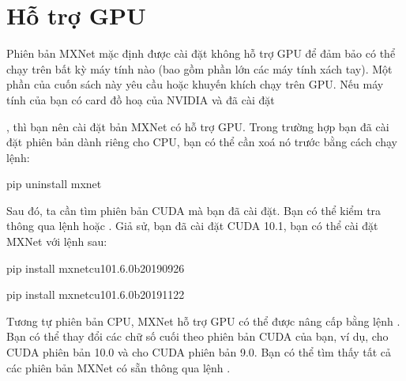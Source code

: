 \documentclass[letterpaper,11pt,english]{sphinxmanual}
\begin{document}
\section{Hỗ trợ GPU}
\label{\detokenize{chapter_install/index_vn:ho-tro-gpu}}\label{\detokenize{chapter_install/index_vn:sec-gpu}}


Phiên bản MXNet mặc định được cài đặt không hỗ trợ GPU để đảm bảo có thể
chạy trên bất kỳ máy tính nào (bao gồm phần lớn các máy tính xách tay).
Một phần của cuốn sách này yêu cầu hoặc khuyến khích chạy trên GPU. Nếu
máy tính của bạn có card đồ hoạ của NVIDIA và đã cài đặt
%
\begin{footnote}[27]\sphinxAtStartFootnote
{}
%
\end{footnote}, thì bạn nên cài
đặt bản MXNet có hỗ trợ GPU. Trong trường hợp bạn đã cài đặt phiên bản
dành riêng cho CPU, bạn có thể cần xoá nó trước bằng cách chạy lệnh:

\begin{sphinxVerbatim}[commandchars=\\\{\}]
pip uninstall mxnet
\end{sphinxVerbatim}



Sau đó, ta cần tìm phiên bản CUDA mà bạn đã cài đặt. Bạn có thể kiểm tra
thông qua lệnh  hoặc
. Giả sử, bạn đã cài đặt CUDA 10.1,
bạn có thể cài đặt MXNet với lệnh sau:

\begin{sphinxVerbatim}[commandchars=\\\{\}]
pip install mxnet\PYGZhy{}cu101.6.0b20190926

pip install mxnet\PYGZhy{}cu101.6.0b20191122
\end{sphinxVerbatim}



Tương tự phiên bản CPU, MXNet hỗ trợ GPU có thể được nâng cấp bằng lệnh
. Bạn có thể thay đổi các chữ số
cuối theo phiên bản CUDA của bạn, ví dụ,  cho CUDA phiên bản
10.0 và  cho CUDA phiên bản 9.0. Bạn có thể tìm thấy tất cả các
phiên bản MXNet có sẵn thông qua lệnh .
\end{document}
